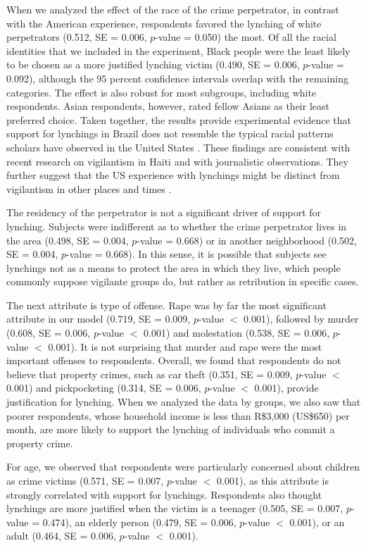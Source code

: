 \documentclass[12pt,a4paper]{article}
\begin{document}
When we analyzed the effect of the race of the crime perpetrator, in contrast
with the American experience, respondents favored the lynching of white
perpetrators (0.512, SE = 0.006, $p$-value = 0.050) the most. Of all the racial
identities that we included in the experiment, Black people were the least
likely to be chosen as a more justified lynching victim (0.490, SE = 0.006,
$p$-value = 0.092), although the 95 percent confidence intervals overlap with
the remaining categories. The effect is also robust for most subgroups,
including white respondents. Asian respondents, however, rated fellow Asians as
their least preferred choice. Taken together, the results provide experimental
evidence that support for lynchings in Brazil does not resemble the typical
racial patterns scholars have observed in the United States
\citep{dray2003hands,seguin2019national,obert2018keeping}. These findings are
consistent with recent research on vigilantism in Haiti
\citep{jung2020lynching} and with journalistic observations. They further
suggest that the US experience with lynchings might be distinct from
vigilantism in other places and times \citep{oliveira2016mob}. 

The residency of the perpetrator is not a significant driver of support for
lynching. Subjects were indifferent as to whether the crime perpetrator lives
in the area (0.498, SE = 0.004, $p$-value = 0.668) or in another neighborhood
(0.502, SE = 0.004, $p$-value = 0.668). In this sense, it is possible that
subjects see lynchings not as a means to protect the area in which they live,
which people commonly suppose vigilante groups do, but rather as retribution in
specific cases. 

The next attribute is type of offense. Rape was by far the most significant
attribute in our model (0.719, SE = 0.009, $p$-value $<$ 0.001), followed by
murder (0.608, SE = 0.006, $p$-value $<$ 0.001) and molestation (0.538, SE =
0.006, $p$-value $<$ 0.001). It is not surprising that murder and rape were the
most important offenses to respondents. Overall, we found that respondents do
not believe that property crimes, such as car theft (0.351, SE = 0.009,
$p$-value $<$ 0.001) and pickpocketing (0.314, SE = 0.006, $p$-value $<$
0.001), provide justification for lynching. When we analyzed the data by
groups, we also saw that poorer respondents, whose household income is less
than R\$3,000 (US\$650) per month, are more likely to support the lynching of
individuals who commit a property crime. 

For age, we observed that respondents were particularly concerned about
children as crime victims (0.571, SE = 0.007, $p$-value $<$ 0.001), as this
attribute is strongly correlated with support for lynchings. Respondents also
thought lynchings are more justified when the victim is a teenager (0.505, SE =
0.007, $p$-value = 0.474), an elderly person (0.479, SE = 0.006, $p$-value $<$
0.001), or an adult (0.464, SE = 0.006, $p$-value $<$ 0.001).
\end{document}
